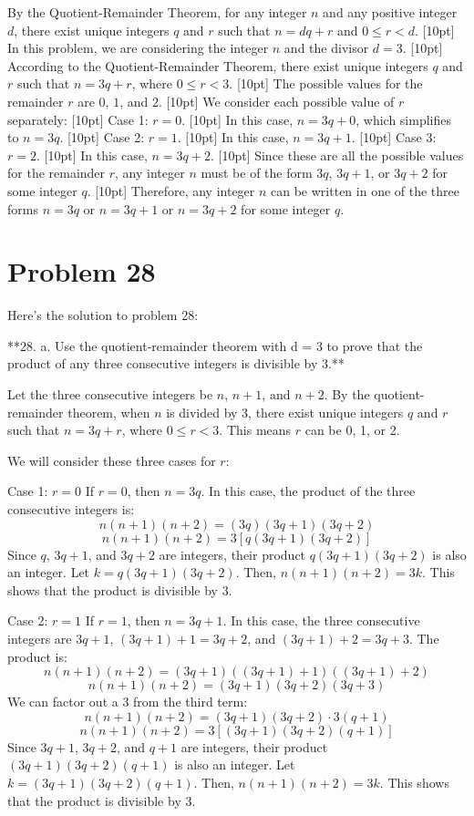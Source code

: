 \documentclass{article}
\begin{document}
By the Quotient-Remainder Theorem, for any integer $n$ and any positive integer $d$, there exist unique integers $q$ and $r$ such that $n = dq + r$ and $0 \le r < d$.
[10pt]
In this problem, we are considering the integer $n$ and the divisor $d=3$.
[10pt]
According to the Quotient-Remainder Theorem, there exist unique integers $q$ and $r$ such that $n = 3q + r$, where $0 \le r < 3$.
[10pt]
The possible values for the remainder $r$ are $0$, $1$, and $2$.
[10pt]
We consider each possible value of $r$ separately:
[10pt]
Case 1: $r = 0$.
[10pt]
In this case, $n = 3q + 0$, which simplifies to $n = 3q$.
[10pt]
Case 2: $r = 1$.
[10pt]
In this case, $n = 3q + 1$.
[10pt]
Case 3: $r = 2$.
[10pt]
In this case, $n = 3q + 2$.
[10pt]
Since these are all the possible values for the remainder $r$, any integer $n$ must be of the form $3q$, $3q+1$, or $3q+2$ for some integer $q$.
[10pt]
Therefore, any integer $n$ can be written in one of the three forms $n = 3q$ or $n = 3q+1$ or $n = 3q+2$ for some integer $q$.

\newpage

\section*{Problem 28}
Here's the solution to problem 28:

**28. a. Use the quotient-remainder theorem with d = 3 to prove that the product of any three consecutive integers is divisible by 3.**

Let the three consecutive integers be $n$, $n+1$, and $n+2$.
By the quotient-remainder theorem, when $n$ is divided by 3, there exist unique integers $q$ and $r$ such that $n = 3q + r$, where $0 \le r < 3$. This means $r$ can be 0, 1, or 2.

We will consider these three cases for $r$:

Case 1: $r = 0$
If $r = 0$, then $n = 3q$.
In this case, the product of the three consecutive integers is:
$$ n(n+1)(n+2) = (3q)(3q+1)(3q+2) $$
$$ n(n+1)(n+2) = 3[q(3q+1)(3q+2)] $$
Since $q$, $3q+1$, and $3q+2$ are integers, their product $q(3q+1)(3q+2)$ is also an integer. Let $k = q(3q+1)(3q+2)$.
Then, $n(n+1)(n+2) = 3k$.
This shows that the product is divisible by 3.

Case 2: $r = 1$
If $r = 1$, then $n = 3q + 1$.
In this case, the three consecutive integers are $3q+1$, $(3q+1)+1 = 3q+2$, and $(3q+1)+2 = 3q+3$.
The product is:
$$ n(n+1)(n+2) = (3q+1)((3q+1)+1)((3q+1)+2) $$
$$ n(n+1)(n+2) = (3q+1)(3q+2)(3q+3) $$
We can factor out a 3 from the third term:
$$ n(n+1)(n+2) = (3q+1)(3q+2) \cdot 3(q+1) $$
$$ n(n+1)(n+2) = 3[(3q+1)(3q+2)(q+1)] $$
Since $3q+1$, $3q+2$, and $q+1$ are integers, their product $(3q+1)(3q+2)(q+1)$ is also an integer. Let $k = (3q+1)(3q+2)(q+1)$.
Then, $n(n+1)(n+2) = 3k$.
This shows that the product is divisible by 3.
\end{document}
